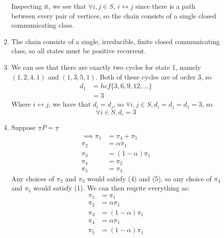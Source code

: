 \documentclass{article}
\begin{document}
\begin{enumerate}
\begin{enumerate}
\begin{enumerate}

Inspecting it, we see that $\forall i,j \in S$, $i \leftrightarrow j$ since there is a path between every pair of vertices, so the chain consists of a single closed communicating class.
\item
The chain consists of a single, irreducible, finite closed communicating class, so all states must be positive recurrent.
\item
We can see that there are exactly two cycles for state 1, namely $(1,2,4,1)$ and $(1,3,5,1)$. Both of these cycles are of order 3, so
\begin{align*}
d_1 &= hcf\{3,6,9,12,\dots\}\\
&= 3
\end{align*}
Where $i\leftrightarrow j$, we have that $d_i=d_j$, so $\forall i,j \in S, d_i=d_j=d_1=3$, so
$$
\forall i \in S, d_i = 3
$$
\item
Suppose $\underline{\pi} P = \underline{\pi}$
\begin{align}
\implies \pi_1 &= \pi_4 + \pi_5\\
\pi_2 &= \alpha \pi_1\\
\pi_3 &= (1-\alpha) \pi_1\\
\pi_4 &= \pi_2 \\
\pi_5 &= \pi_3
\end{align}
Any choices of $\pi_2$ and $\pi_3$ would satisfy (4) and (5), so any choice of  $\pi_4$ and $\pi_5$ would satisfy (1). We can then reqrite everything as:
\begin{align*}
\pi_1 &= \pi_1\\
\pi_2 &= \alpha \pi_1\\
\pi_3 &= (1-\alpha) \pi_1\\
\pi_4 &= \alpha\pi_1 \\
\pi_5 &= (1-\alpha)\pi_1 
\end{align*}

\end{enumerate}
\end{enumerate}
\end{enumerate}
\end{document}
